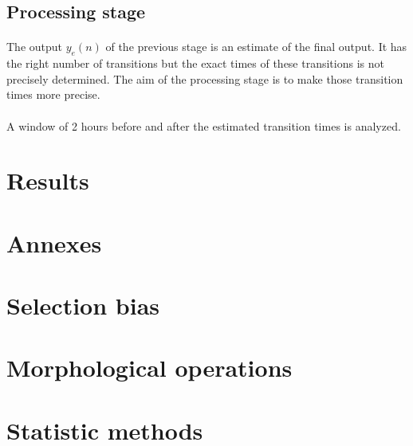 \documentclass[a4paper,10pt]{article}
\begin{document}

\subsection{Processing stage}

\paragraph{}
The output $y_e(n)$ of the previous stage is an estimate of the final output. It has the right number of transitions but the exact times of these transitions is not precisely determined. The aim of the processing stage is to make those transition times more precise.

\paragraph{}
A window of 2 hours before and after the estimated transition times is analyzed.

\section{Results}


\newpage
\section{Annexes}
\appendix
\section{Selection bias}
\label{sec:bias}
\section{Morphological operations}
\label{sec:morphology}
\section{Statistic methods}
\label{sec:statMethods}


 
\end{document}

